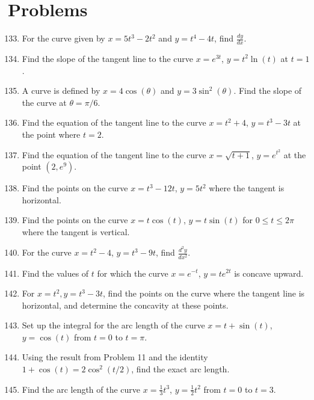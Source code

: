 \documentclass{article}
\begin{document}
\section*{Problems}
\begin{enumerate}
    \setcounter{enumi}{132}
\item For the curve given by $x = 5t^3 - 2t^2$ and $y = t^4 - 4t$, find $\frac{dy}{dx}$.

\item Find the slope of the tangent line to the curve $x = e^{3t}$, $y = t^2 \ln(t)$ at $t=1$.

\item A curve is defined by $x = 4\cos(\theta)$ and $y = 3\sin^2(\theta)$. Find the slope of the curve at $\theta = \pi/6$.

\item Find the equation of the tangent line to the curve $x = t^2 + 4$, $y = t^3 - 3t$ at the point where $t=2$.

\item Find the equation of the tangent line to the curve $x = \sqrt{t+1}$, $y = e^{t^2}$ at the point $(2, e^9)$.

\item Find the points on the curve $x = t^3 - 12t$, $y = 5t^2$ where the tangent is horizontal.

\item Find the points on the curve $x = t\cos(t)$, $y = t\sin(t)$ for $0 \le t \le 2\pi$ where the tangent is vertical.

\item For the curve $x = t^2 - 4$, $y = t^3 - 9t$, find $\frac{d^2y}{dx^2}$.

\item Find the values of $t$ for which the curve $x = e^{-t}$, $y = t e^{2t}$ is concave upward.

\item For $x=t^2, y=t^3-3t$, find the points on the curve where the tangent line is horizontal, and determine the concavity at these points.

\item Set up the integral for the arc length of the curve $x = t + \sin(t)$, $y = \cos(t)$ from $t=0$ to $t=\pi$.

\item Using the result from Problem 11 and the identity $1+\cos(t) = 2\cos^2(t/2)$, find the exact arc length.

\item Find the arc length of the curve $x = \frac{1}{3}t^3$, $y = \frac{1}{2}t^2$ from $t=0$ to $t=3$.


\end{enumerate}
\end{document}
